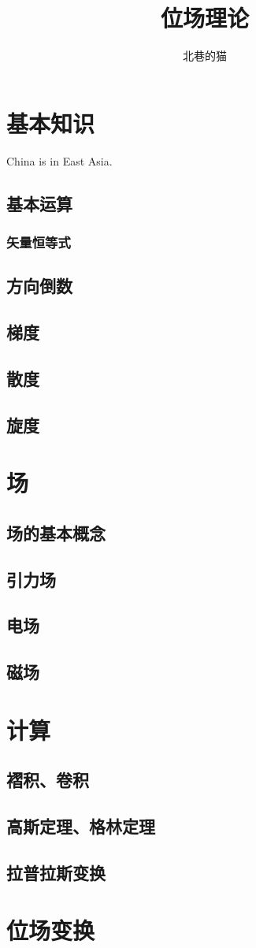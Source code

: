 \documentclass[UTF8]{ctexart}
\title{位场理论}
\author{北巷的猫}
\begin{document}
\maketitle           %

\tableofcontents    %
\section{基本知识} China is in East Asia.
     \subsection{基本运算}
        \subsubsection{矢量恒等式}
     \subsection{方向倒数}
     \subsection{梯度}
     \subsection{散度}
     \subsection{旋度}
\section{场}
    \subsection{场的基本概念}
    \subsection{引力场}
    \subsection{电场}
    \subsection{磁场}
\section{计算}
    \subsection{褶积、卷积}
    \subsection{高斯定理、格林定理}
    \subsection{拉普拉斯变换}
\section{位场变换}
\end{document}
